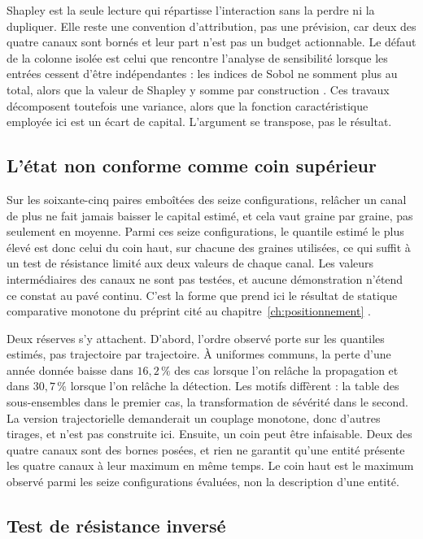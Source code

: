 Shapley est la seule lecture qui
répartisse l'interaction sans la perdre ni la dupliquer. Elle reste une convention d'attribution, pas
une prévision, car deux des quatre canaux sont bornés et leur part n'est pas un budget actionnable. Le défaut
de la colonne isolée est celui que rencontre l'analyse de sensibilité lorsque les entrées cessent
d'être indépendantes : les indices de Sobol ne somment plus au total, alors que la valeur de Shapley y
somme par construction \citep{Owen2014, IoossPrieur2019}. Ces travaux décomposent toutefois une
variance, alors que la fonction caractéristique employée ici est un écart de capital. L'argument se
transpose, pas le résultat.

\subsection{L'état non conforme comme coin supérieur}
\label{sec:coin-superieur}

Sur les soixante-cinq paires emboîtées des seize configurations, relâcher un canal de plus ne fait
jamais baisser le capital estimé, et cela vaut graine par graine, pas seulement en moyenne. Parmi ces
seize configurations, le quantile estimé le plus élevé est donc celui du coin haut, sur chacune des
graines utilisées, ce qui suffit à un test de résistance limité aux deux valeurs de chaque canal. Les valeurs intermédiaires des canaux ne sont pas testées, et
aucune démonstration n'étend ce constat au pavé continu. C'est la forme que prend ici le résultat de statique comparative monotone du préprint cité au
chapitre~\ref{ch:positionnement} \citep{ccrn2026}.

Deux réserves s'y attachent. D'abord, l'ordre observé porte sur les quantiles estimés, pas trajectoire par
trajectoire. À uniformes communs, la perte d'une année donnée baisse dans $16{,}2\,\%$ des cas lorsque l'on relâche la
propagation et dans $30{,}7\,\%$ lorsque l'on relâche la détection. Les motifs diffèrent : la table
des sous-ensembles dans le premier cas, la transformation de sévérité dans le second. La version
trajectorielle demanderait un couplage monotone, donc d'autres tirages, et n'est pas construite ici. Ensuite, un coin peut être infaisable.
Deux des quatre canaux sont des bornes posées, et rien ne garantit qu'une entité présente les quatre
canaux à leur maximum en même temps. Le coin haut est le maximum observé parmi les seize
configurations évaluées, non la description d'une entité.

\subsection{Test de résistance inversé}
\label{sec:inverse}

